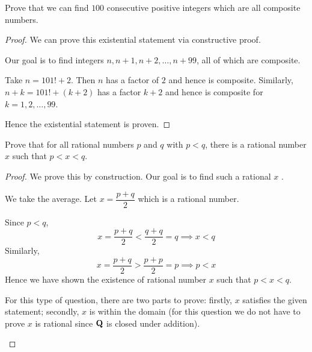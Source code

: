 \begin{exercise}
Prove that we can find $100$ consecutive positive integers which are all composite numbers.
\end{exercise}

\begin{proof}
We can prove this existential statement via constructive proof.

Our goal is to find integers $n,n+1,n+2,\dots,n+99$, all of which are composite.

Take $n=101!+2$. Then $n$ has a factor of $2$ and hence is composite. Similarly, $n+k=101!+(k+2)$ has a factor $k+2$ and hence is composite for $k=1,2,\dots,99$.

Hence the existential statement is proven.
\end{proof}

\begin{exercise}
Prove that for all rational numbers $p$ and $q$ with $p<q$, there is a rational number $x$ such that $p<x<q$.
\end{exercise}
\begin{proof}
We prove this by construction. Our goal is to find such a rational $x$ .

We take the average. Let $x=\dfrac{p+q}{2}$ which is a rational number.

Since $p<q$, 
\[ x=\frac{p+q}{2}<\frac{q+q}{2}=q \implies x<q \]
Similarly,
\[ x=\frac{p+q}{2}>\frac{p+p}{2}=p \implies p<x \]
Hence we have shown the existence of rational number $x$ such that $p<x<q$.

\begin{remark}
For this type of question, there are two parts to prove: firstly, $x$ satisfies the given statement; secondly, $x$ is within the domain (for this question we do not have to prove $x$ is rational since $\mathbf Q$ is closed under addition).
\end{remark}
\end{proof}

